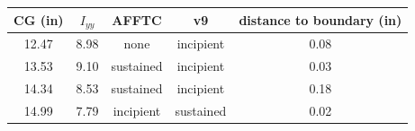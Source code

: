 \begin{tabular}{ccccc}
\toprule
CG (in) & $I_{yy}$ & AFFTC & v9 & distance to boundary (in) \\
\midrule
12.47 & 8.98 & none & incipient & 0.08 \\
13.53 & 9.10 & sustained & incipient & 0.03 \\
14.34 & 8.53 & sustained & incipient & 0.18 \\
14.99 & 7.79 & incipient & sustained & 0.02 \\
\bottomrule
\end{tabular}
